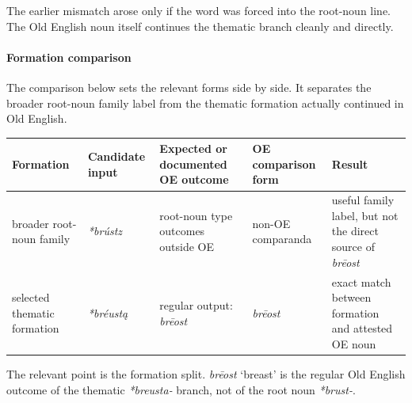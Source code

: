 \documentclass[
  british,
  a4paper,
]{article}
\newcounter{none} %
\begin{document}
The earlier mismatch arose only if the word was forced into the
root-noun line. The Old English noun itself continues the thematic
branch cleanly and directly.

\paragraph{Formation comparison}\label{formation-comparison}

The comparison below sets the relevant forms side by side. It separates
the broader root-noun family label from the thematic formation actually
continued in Old English.

{\def\LTcaptype{none} %
\begin{longtable}[]{@{}
  >{\raggedright\arraybackslash}p{}
  >{\raggedright\arraybackslash}p{}
  >{\raggedright\arraybackslash}p{}
  >{\raggedright\arraybackslash}p{}
  >{\raggedright\arraybackslash}p{}@{}}
\toprule\noalign{}
\begin{minipage}[b]{\linewidth}\raggedright
Formation
\end{minipage} & \begin{minipage}[b]{\linewidth}\raggedright
Candidate input
\end{minipage} & \begin{minipage}[b]{\linewidth}\raggedright
Expected or documented OE outcome
\end{minipage} & \begin{minipage}[b]{\linewidth}\raggedright
OE comparison form
\end{minipage} & \begin{minipage}[b]{\linewidth}\raggedright
Result
\end{minipage} \\
\midrule\noalign{}
\endhead
\bottomrule\noalign{}
\endlastfoot
broader root-noun family & {\emph{*brústz}} & root-noun type outcomes
outside OE & non-OE comparanda & useful family label, but not the direct
source of \emph{brēost} \\
selected thematic formation & {\emph{*bréustą}} & regular output:
\emph{brēost} & {\emph{brēost}} & exact match between formation and
attested OE noun \\
\end{longtable}
}

The relevant point is the formation split. {\emph{brēost}} `breast' is
the regular Old English outcome of the thematic {\emph{*breusta-}}
branch, not of the root noun {\emph{*brust-}}.
\end{document}
